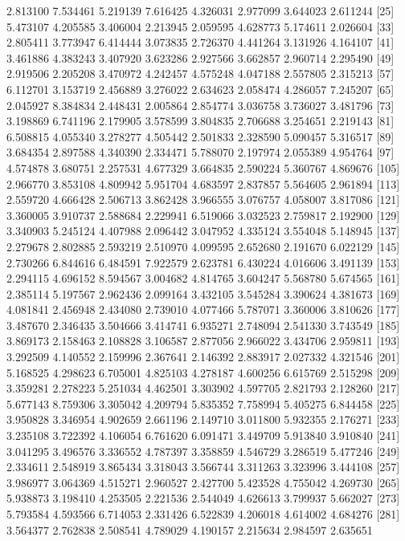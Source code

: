 \documentclass[12pt]{article}
\begin{document}
\begin{Schunk}
\begin{Soutput}
 [17] 2.813100 7.534461 5.219139 7.616425 4.326031 2.977099 3.644023 2.611244
 [25] 5.473107 4.205585 3.406004 2.213945 2.059595 4.628773 5.174611 2.026604
 [33] 2.805411 3.773947 6.414444 3.073835 2.726370 4.441264 3.131926 4.164107
 [41] 3.461886 4.383243 3.407920 3.623286 2.927566 3.662857 2.960714 2.295490
 [49] 2.919506 2.205208 3.470972 4.242457 4.575248 4.047188 2.557805 2.315213
 [57] 6.112701 3.153719 2.456889 3.276022 2.634623 2.058474 4.286057 7.245207
 [65] 2.045927 8.384834 2.448431 2.005864 2.854774 3.036758 3.736027 3.481796
 [73] 3.198869 6.741196 2.179905 3.578599 3.804835 2.706688 3.254651 2.219143
 [81] 6.508815 4.055340 3.278277 4.505442 2.501833 2.328590 5.090457 5.316517
 [89] 3.684354 2.897588 4.340390 2.334471 5.788070 2.197974 2.055389 4.954764
 [97] 4.574878 3.680751 2.257531 4.677329 3.664835 2.590224 5.360767 4.869676
[105] 2.966770 3.853108 4.809942 5.951704 4.683597 2.837857 5.564605 2.961894
[113] 2.559720 4.666428 2.506713 3.862428 3.966555 3.076757 4.058007 3.817086
[121] 3.360005 3.910737 2.588684 2.229941 6.519066 3.032523 2.759817 2.192900
[129] 3.340903 5.245124 4.407988 2.096442 3.047952 4.335124 3.554048 5.148945
[137] 2.279678 2.802885 2.593219 2.510970 4.099595 2.652680 2.191670 6.022129
[145] 2.730266 6.844616 6.484591 7.922579 2.623781 6.430224 4.016606 3.491139
[153] 2.294115 4.696152 8.594567 3.004682 4.814765 3.604247 5.568780 5.674565
[161] 2.385114 5.197567 2.962436 2.099164 3.432105 3.545284 3.390624 4.381673
[169] 4.081841 2.456948 2.434080 2.739010 4.077466 5.787071 3.360006 3.810626
[177] 3.487670 2.346435 3.504666 3.414741 6.935271 2.748094 2.541330 3.743549
[185] 3.869173 2.158463 2.108828 3.106587 2.877056 2.966022 3.434706 2.959811
[193] 3.292509 4.140552 2.159996 2.367641 2.146392 2.883917 2.027332 4.321546
[201] 5.168525 4.298623 6.705001 4.825103 4.278187 4.600256 6.615769 2.515298
[209] 3.359281 2.278223 5.251034 4.462501 3.303902 4.597705 2.821793 2.128260
[217] 5.677143 8.759306 3.305042 4.209794 5.835352 7.758994 5.405275 6.844458
[225] 3.950828 3.346954 4.902659 2.661196 2.149710 3.011800 5.932355 2.176271
[233] 3.235108 3.722392 4.106054 6.761620 6.091471 3.449709 5.913840 3.910840
[241] 3.041295 3.496576 3.336552 4.787397 3.358859 4.546729 3.286519 5.477246
[249] 2.334611 2.548919 3.865434 3.318043 3.566744 3.311263 3.323996 3.444108
[257] 3.986977 3.064369 4.515271 2.960527 2.427700 5.423528 4.755042 4.269730
[265] 5.938873 3.198410 4.253505 2.221536 2.544049 4.626613 3.799937 5.662027
[273] 5.793584 4.593566 6.714053 2.331426 6.522839 4.206018 4.614002 4.684276
[281] 3.564377 2.762838 2.508541 4.789029 4.190157 2.215634 2.984597 2.635651

\end{Soutput}
\end{Schunk}
\end{document}
